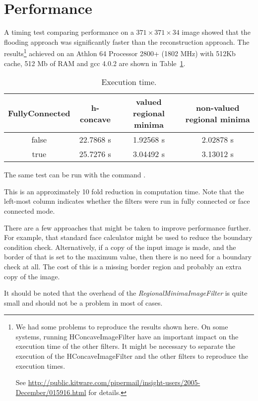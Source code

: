 \documentclass{InsightArticle}
\begin{document}
\section{Performance}
A timing test comparing performance on a $371 \times 371 \times 34$
image showed that the flooding approach was significantly faster than
the reconstruction approach. The results\footnote{We had some problems
to reproduce the results shown here. On some systems, running
HConcaveImageFilter have an important impact on the execution time of the other
filters. It might be necessary to separate the execution of the 
HConcaveImageFilter and the other filters to reproduce the execution
times.

See \url{http://public.kitware.com/pipermail/insight-users/2005-December/015916.html}
for details.} achieved on an Athlon 64 
Processor 2800+ (1802 MHz) with 512Kb cache, 512 Mb of RAM and gcc
4.0.2 are shown in Table~\ref{perf}.

\begin{table}[htbp]
\centering
\begin{tabular}{cccc}
\hline
FullyConnected & h-concave & valued regional minima & non-valued regional minima \\
\hline
\hline
false & 22.7868 s & 1.92568 s & 2.02878 s\\
true  & 25.7276 s & 3.04492 s & 3.13012 s\\
\hline
\end{tabular}
\caption{Execution time.\label{perf}}
\end{table}

The same test can be run with the command .

This is an approximately 10 fold reduction in computation time. Note
that the left-most column indicates whether the filters were run in
fully connected or face connected mode.

There are a few approaches that might be taken to improve performance
further. For example, that standard face calculator might be used to
reduce the boundary condition check. Alternatively, if a copy of the
input image is made, and the border of that is set to the maximum
value, then there is no need for a boundary check at all. The cost of
this is a missing border region and probably an extra copy of the
image.

It should be noted that the overhead of the {\em RegionalMinimaImageFilter}
is quite small and should not be a problem in most of cases.
\end{document}

